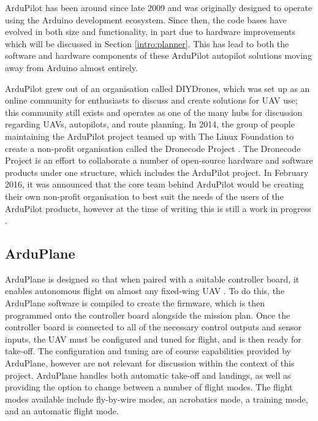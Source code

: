 ArduPilot has been around since late 2009 and was originally designed to operate using the Arduino development ecosystem. Since then, the code bases have evolved in both size and functionality, in part due to hardware improvements which will be discussed in Section \ref{intro:planner}. This has lead to both the software and hardware components of these ArduPilot autopilot solutions moving away from Arduino almost entirely.

ArduPilot grew out of an organisation called DIYDrones, which was set up as an online community for enthusiasts to discuss and create solutions for UAV use; this community still exists and operates as one of the many hubs for discussion regarding UAVs, autopilots, and route planning. In 2014, the group of people maintaining the ArduPilot project teamed up with The Linux Foundation to create a non-profit organisation called the Dronecode Project \cite{Dronecode}. The Dronecode Project is an effort to collaborate a number of open-source hardware and software products under one structure, which includes the ArduPilot project. In February 2016, it was announced that the core team behind ArduPilot would be creating their own non-profit organisation to best suit the needs of the users of the ArduPilot products, however at the time of writing this is still a work in progress \cite{ArduNonProfit}.

\subsection{ArduPlane}
\label{intro:arduplane}

ArduPlane is designed so that when paired with a suitable controller board, it enables autonomous flight on almost any fixed-wing UAV \cite{ArduPlaneHome}. To do this, the ArduPlane software is compiled to create the firmware, which is then programmed onto the controller board alongside the mission plan. Once the controller board is connected to all of the necessary control outputs and sensor inputs, the UAV must be configured and tuned for flight, and is then ready for take-off. The configuration and tuning are of course capabilities provided by ArduPlane, however are not relevant for discussion within the context of this project. ArduPlane handles both automatic take-off and landings, as well as providing the option to change between a number of flight modes. The flight modes available include fly-by-wire modes, an acrobatics mode, a training mode, and an automatic flight mode.

